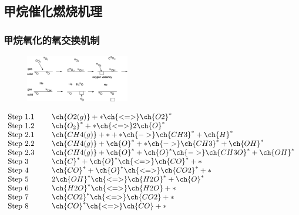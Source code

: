 \documentclass[cjk,slidestop,compress,mathserif,blue]{beamer}
\begin{document}
\subsection{甲烷催化燃烧机理}
\frame
{
	\frametitle{甲烷氧化的氧交换机制}
\begin{figure}[h!]
\centering
\vskip -12pt
\includegraphics[height=0.8in]{Figures/Oxygen_exchange_mechanism_for_CH4_oxidation.png}
\caption{\fontsize{5.5pt}{4.2pt}\selectfont{催化剂表面甲烷氧化的氧交换过程示意}}%
\label{CH4_comp_mechan}
\end{figure}
\vskip -10pt
	{\fontsize{9.5pt}{11pt}\selectfont
\begin{displaymath}
	\begin{array}{ll}
		\mathrm{Step~1.1}\quad~&\ch{O2(g)}+{\ast}\ch{<=>}\ch{O2}^{\ast} \\
		\mathrm{Step~1.2}\quad~&\ch{O_2}^{\ast}+{\ast}\ch{<=>}2\ch{O}^{\ast} \\
		\mathrm{Step~2.1}\quad~&\ch{CH4(g)}+{\ast}+{\ast}\ch{->}\ch{CH3}^{\ast}+\ch{H}^{\ast} \\
		\mathrm{Step~2.2}\quad~&\ch{CH4(g)}+\ch{O}^{\ast}+{\ast}\ch{->}\ch{CH3}^{\ast}+\ch{OH}^{\ast} \\
		\mathrm{Step~2.3}\quad~&\ch{CH4(g)}+\ch{O}^{\ast}+\ch{O}^{\ast}\ch{->}\ch{CH3O}^{\ast}+\ch{OH}^{\ast} \\
		\mathrm{Step~3}\quad~&\ch{C}^{\ast}+\ch{O}^{\ast}\ch{<=>}\ch{CO}^{\ast}+{\ast} \\
		\mathrm{Step~4}\quad~&\ch{CO}^{\ast}+\ch{O}^{\ast}\ch{<=>}\ch{CO2}^{\ast}+{\ast} \\
		\mathrm{Step~5}\quad~&2\ch{OH}^{\ast}\ch{<=>}\ch{H2O}^{\ast}+\ch{O}^{\ast} \\
		\mathrm{Step~6}\quad~&\ch{H2O}^{\ast}\ch{<=>}\ch{H2O}+{\ast} \\
		\mathrm{Step~7}\quad~&\ch{CO2}^{\ast}\ch{<=>}\ch{CO2}+{\ast} \\
		\mathrm{Step~8}\quad~&\ch{CO}^{\ast}\ch{<=>}\ch{CO}+{\ast}
	\end{array}
\end{displaymath}}
}
\end{document}
